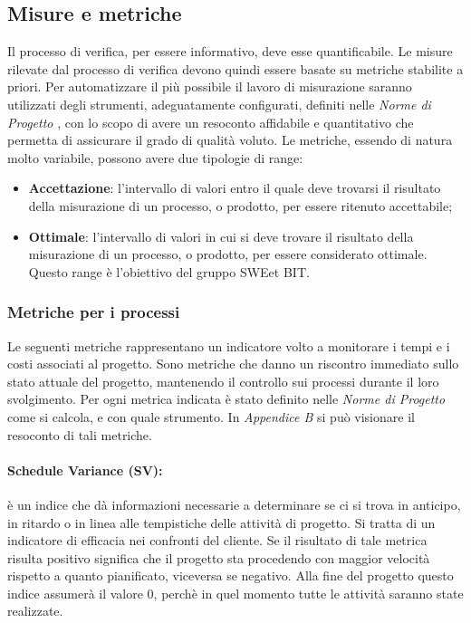 \subsection{Misure e metriche}
Il processo di verifica, per essere informativo, deve esse quantificabile. Le misure rilevate
dal processo di verifica devono quindi essere basate su metriche stabilite a priori. Per automatizzare il più possibile il lavoro di misurazione saranno utilizzati degli strumenti, adeguatamente configurati, definiti nelle \emph{Norme di Progetto \VersioneNP{}}, con lo scopo di avere un resoconto affidabile e quantitativo che permetta di assicurare il grado di qualità voluto.
Le metriche, essendo di natura molto variabile, possono avere due tipologie di range:
\begin{itemize}
\item \textbf{Accettazione}: l'intervallo di valori entro il quale deve trovarsi il risultato della misurazione di un processo, o prodotto, per essere ritenuto accettabile;
\item \textbf{Ottimale}: l'intervallo di valori in cui si deve trovare il risultato della misurazione di un processo, o prodotto, per essere considerato ottimale.
    Questo range è l'obiettivo del gruppo SWEet BIT.
\end{itemize}

\subsubsection{Metriche per i processi}
Le seguenti metriche rappresentano un indicatore volto a monitorare i tempi e i costi associati al progetto. Sono metriche che danno un riscontro immediato sullo stato attuale del progetto, mantenendo il controllo sui processi durante il loro svolgimento.\linebreak
Per ogni metrica indicata è stato definito nelle \emph{Norme di Progetto \VersioneNP{}} come si calcola, e con quale strumento. In \emph{Appendice B} si può visionare il resoconto di tali metriche.

\paragraph{Schedule Variance (SV):} è un indice che dà informazioni necessarie a determinare se ci si trova in anticipo, in ritardo o in linea alle tempistiche delle attività di progetto. Si tratta di un indicatore di efficacia nei confronti del cliente. Se il risultato di tale metrica risulta positivo significa che il progetto sta procedendo con maggior velocità rispetto a quanto pianificato, viceversa
se negativo. Alla fine del progetto questo indice assumerà il valore 0, perchè in quel momento tutte le attività saranno state realizzate.

